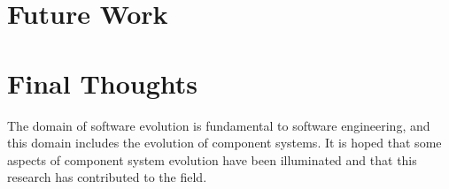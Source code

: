 \section{Future Work}



\section{Final Thoughts}
The domain of software evolution is fundamental to software engineering, and this domain includes the evolution of component systems.
It is hoped that some aspects of component system evolution have been illuminated and that this research has contributed to the field. 

 
